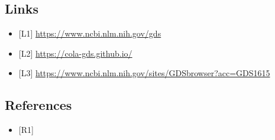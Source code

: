 \documentclass[
]{article}
\providecommand{\tightlist}{%
  \setlength{\itemsep}{0pt}\setlength{\parskip}{0pt}}
\begin{document}
\subsection{Links}\label{links}

\begin{itemize}
\tightlist
\item
  {[}L1{]} \url{https://www.ncbi.nlm.nih.gov/gds}
\item
  {[}L2{]} \url{https://cola-gds.github.io/}
\item
  {[}L3{]}
  \url{https://www.ncbi.nlm.nih.gov/sites/GDSbrowser?acc=GDS1615}
\end{itemize}

\subsection{References}\label{references}

\begin{itemize}
\tightlist
\item
  {[}R1{]}
\end{itemize}
\end{document}
